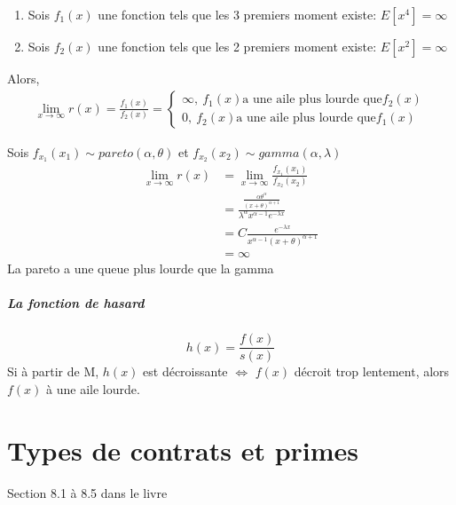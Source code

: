 \documentclass[12pt, french]{report}
\begin{document}
\begin{enumerate}
    \item Sois $f_1(x)$ une fonction tels que les 3 premiers moment existe: $E[x^4] = \infty$
    \item Sois $f_2(x)$ une fonction tels que les 2 premiers moment existe: $E[x^2] = \infty$
\end{enumerate}
Alors,
\begin{align*}
    \lim_{x\to\infty} r(x) = \frac{f_1(x)}{f_2(x)} = \left\{
                                                        \begin{array}{ll}
                                                            \infty ,\: f_1(x) \text{a une aile plus lourde que} f_2(x) \\
                                                            0      ,\: f_2(x) \text{a une aile plus lourde que} f_1(x) 
                                                        \end{array}
                                                    \right.
\end{align*}
\begin{exemple}
    Sois $f_{x_1}(x_1) \sim pareto(\alpha, \theta)$ et $f_{x_2}(x_2) \sim gamma(\alpha, \lambda)$ 
    \begin{align*}
        \lim_{x\to\infty} r(x) &= \lim_{x\to\infty} \frac{f_{x_1}(x_1)}{f_{x_2}(x_2)} \\
                               &= \frac{\frac{\alpha \theta^\alpha}{(x + \theta)^{\alpha + 1}}}{\lambda^\alpha x^{\alpha - 1} e^{-\lambda x}} \\
                               &= C \frac{e^{-\lambda x}}{x^{\alpha - 1} (x + \theta)^{\alpha + 1}} \\
                               &= \infty
    \end{align*}      
    La pareto a une queue plus lourde que la gamma
\end{exemple}

\paragraph{La fonction de hasard}
\begin{equation}
    h(x) = \frac{f(x)}{s(x)}
\end{equation}
Si à partir de M, $h(x)$ est décroissante $\Leftrightarrow$ $f(x)$ décroit trop lentement, alors $f(x)$ à une aile lourde. 




\chapter{Types de contrats et primes}
Section 8.1 à 8.5 dans le livre
\end{document}
